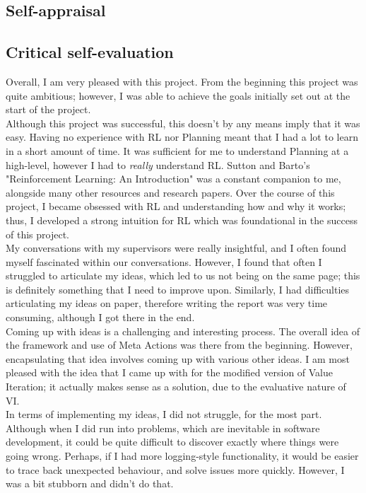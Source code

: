 \begin{appendices}

%
%
\chapter{Self-appraisal}
\section{Critical self-evaluation}
Overall, I am very pleased with this project. From the beginning this project was quite ambitious; however, I was able to achieve the goals initially set out at the start of the project.
\\Although this project was successful, this doesn't by any means imply that it was easy. Having no experience with RL nor Planning meant that I had a lot to learn in a short amount of time. It was sufficient for me to understand Planning at a high-level, however I had to \textit{really} understand RL. Sutton and Barto's "Reinforcement Learning: An Introduction" \cite{Sutton1998} was a constant companion to me, alongside many other resources and research papers. Over the course of this project, I became obsessed with RL and understanding how and why it works; thus, I developed a strong intuition for RL which was foundational in the success of this project.
\\My conversations with my supervisors were really insightful, and I often found myself fascinated within our conversations. However, I found that often I struggled to articulate my ideas, which led to us not being on the same page; this is definitely something that I need to improve upon. Similarly, I had difficulties articulating my ideas on paper, therefore writing the report was very time consuming, although I got there in the end.
\\ Coming up with ideas is a challenging and interesting process. The overall idea of the framework and use of Meta Actions was there from the beginning. However, encapsulating that idea involves coming up with various other ideas. I am most pleased with the idea that I came up with for the modified version of Value Iteration; it actually makes sense as a solution, due to the evaluative nature of VI.
\\ In terms of implementing my ideas, I did not struggle, for the most part. Although when I did run into problems, which are inevitable in software development, it could be quite difficult to discover exactly where things were going wrong. Perhaps, if I had more logging-style functionality, it would be easier to trace back unexpected behaviour, and solve issues more quickly. However, I was a bit stubborn and didn't do that.

\end{appendices}
